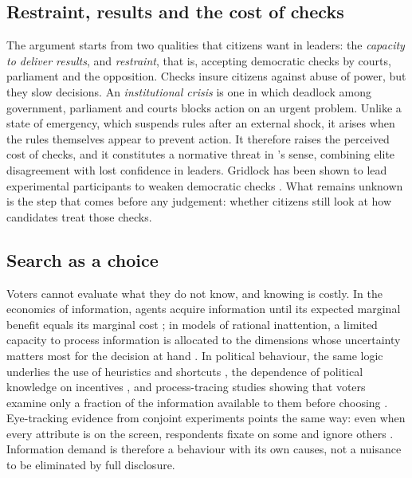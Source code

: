 \documentclass[11pt]{article}
\begin{document}
\subsection{Restraint, results and the cost of checks}

The argument starts from two qualities that citizens want in leaders: the \emph{capacity to deliver results}, and \emph{restraint}, that is, accepting democratic checks by courts, parliament and the opposition. Checks insure citizens against abuse of power, but they slow decisions. An \emph{institutional crisis} is one in which deadlock among government, parliament and courts blocks action on an urgent problem. Unlike a state of emergency, which suspends rules after an external shock, it arises when the rules themselves appear to prevent action. It therefore raises the perceived cost of checks, and it constitutes a normative threat in \textcite{Stenner2005}'s sense, combining elite disagreement with lost confidence in leaders. Gridlock has been shown to lead experimental participants to weaken democratic checks \parencite{FortezaEtAl2024}. What remains unknown is the step that comes before any judgement: whether citizens still look at how candidates treat those checks.

\subsection{Search as a choice}

Voters cannot evaluate what they do not know, and knowing is costly. In the economics of information, agents acquire information until its expected marginal benefit equals its marginal cost \parencite{Stigler1961}; in models of rational inattention, a limited capacity to process information is allocated to the dimensions whose uncertainty matters most for the decision at hand \parencite{Sims2003,CaplinDean2015}. In political behaviour, the same logic underlies the use of heuristics and shortcuts \parencite{Lupia1994,LauRedlawsk2001,TverskyKahneman1974}, the dependence of political knowledge on incentives \parencite{PriorLupia2008}, and process-tracing studies showing that voters examine only a fraction of the information available to them before choosing \parencite{LauRedlawsk2006}. Eye-tracking evidence from conjoint experiments points the same way: even when every attribute is on the screen, respondents fixate on some and ignore others \parencite{JenkeEtAl2021}. Information demand is therefore a behaviour with its own causes, not a nuisance to be eliminated by full disclosure.
\end{document}
